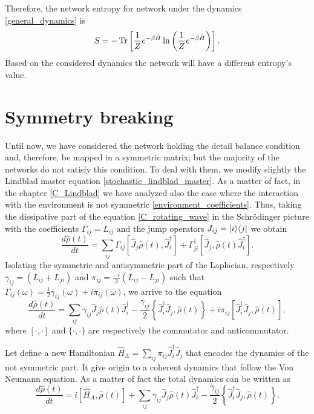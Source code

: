 Therefore, the network entropy for network under the dynamics \eqref{general_dynamics} is 
\begin{equation}
    S = -\operatorname{Tr}\left[\frac{1}{Z}e^{-\beta\hat H}\ln\left(\frac{1}{Z}e^{-\beta\hat H}\right) \right].
\end{equation}
Based on the considered dynamics the network will have a different entropy's value.



\newpage
\section{Symmetry breaking}

Until now, we have considered the network holding the detail balance condition and, therefore, be mapped in a symmetric matrix; 
but the majority of the networks do not satisfy this condition. To deal with them, we modify slightly the Lindblad master equation \eqref{stochastic_lindblad_master}. 
As a matter of fact, in the chapter \ref{C_Lindblad} we have analyzed also the case where the interaction with the environment is not symmetric \eqref{environment_coefficients}. Thus, taking the dissipative part of the equation \eqref{C_rotating_wave} in the Schrödinger picture with the coefficients $\Gamma_{ij} = L_{ij}$ and the jump operators $J_{ij} = \lvert i\rangle\langle j\rvert$ we obtain 
\begin{equation}
    \frac{d\hat\rho(t)}{dt} = \sum_{ij}\Gamma_{ij}\left[\hat J_j\hat\rho(t),\hat J_i^\dagger\right]+\Gamma_{ji}^\dagger\left[\hat J_j,\hat\rho(t)\hat J_i^\dagger\right].
\end{equation}
Isolating the symmetric and antisymmetric part of the Laplacian, respectively $\gamma_{ij} = \left(L_{ij} + L_{ji}\right)$ and $\pi_{ij} =  \frac{-i}{2}\left(L_{ij}-L_{ji}\right)$ such that $\Gamma_{ij}(\omega) =\frac{1}{2}\gamma_{ij}(\omega)+i\pi_{ij}(\omega)$, we arrive to the equation
\begin{equation}
    \frac{d\hat\rho(t)}{dt} = \sum_{ij}\gamma_{ij}\hat J_j\hat\rho(t)\hat J_i^\dagger -\frac{\gamma_{ij}}{2}\left\{\hat J_i^\dagger\hat J_j,\hat\rho(t)\right\} + i\pi_{ij}\left[\hat J_i^\dagger\hat J_j,\hat\rho(t)\right],
\end{equation}
where $[\cdot,\cdot]$ and $\{\cdot,\cdot\}$ are respectively the commutator and anticommutator.

Let define a new Hamiltonian $\hat H_{A} = \sum_{ij}\pi_{ij}\hat J_i^\dagger\hat J_j$ that encodes the dynamics of the not symmetric part. 
It give origin to a coherent dynamics that follow the Von Neumann equation. As a matter of fact the total dynamics can be written as
\begin{equation}\label{antisymmetric_master_equation}
    \frac{d\hat\rho(t)}{dt} = i\left[\hat H_{A},\hat\rho(t)\right] + \sum_{ij}\gamma_{ij}\hat J_j\hat\rho(t)\hat J_i^\dagger -\frac{\gamma_{ij}}{2}\left\{\hat J_i^\dagger\hat J_j,\hat\rho(t)\right\}.
\end{equation}

